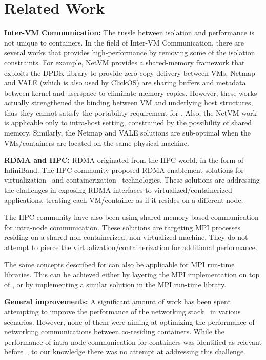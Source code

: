 \section{Related Work} \label{sec:related}


\textbf{Inter-VM Communication:} 
The tussle between isolation and performance is not unique to containers.
In the field of Inter-VM Communication, there are several works that provides
high-performance by removing some of the isolation constraints.
For example, NetVM\cite{netvm} provides a shared-memory framework that
exploits the DPDK library to provide zero-copy delivery between VMs.
Netmap\cite{netmap} and VALE\cite{vale} (which is also used by ClickOS\cite{clickos}) 
are sharing buffers and metadata between kernel and userspace to eliminate memory copies.
However, these works actually strengthened the binding between VM and underlying host
structures, thus they cannot satisfy the portability requirement for \sysname. 
Also, the NetVM work is applicable only to intra-host setting,
constrained by the possibility of shared memory. Similarly, the Netmap
and VALE solutions are sub-optimal when the VMs/containers are located
on the same physical machine.

\textbf{RDMA and HPC:} RDMA originated from the HPC world, in the form of InfiniBand. The HPC
community proposed RDMA enablement solutions for
virtualization~\cite{ranadive2012toward} and
containerization~\cite{rdmacontainers} technologies. These solutions
are addressing the challenges in exposing RDMA interfaces to
virtualized/containerized applications, treating each VM/container as
if it resides on a different node.

The HPC community have also been using shared-memory based
communication~\cite{KNEM,MPI:p:MPI,HybridMPI} for intra-node
communication. These solutions are targeting MPI processes residing on
a shared non-containerized, non-virtualized machine. They do not
attempt to pierce the virtualization/containerization for additional
performance.

The same concepts described for \sysname can also be applicable for
MPI run-time libraries. This can be achieved either by layering the
MPI implementation on top of \sysname, or by implementing a similar
solution in the MPI run-time library.

\textbf{General improvements:} A significant amount of work has been
spent attempting to improve the performance of the networking
stack~\cite{lls,rfc7609,XenLoop} in various scenarios. However, none
of them were aiming at optimizing the performance of networking
communications between co-residing containers. While the performance
of intra-node communication for containers was identified as relevant
before~\cite{container-networking-modules}, to our knowledge there was
no attempt at addressing this challenge.



